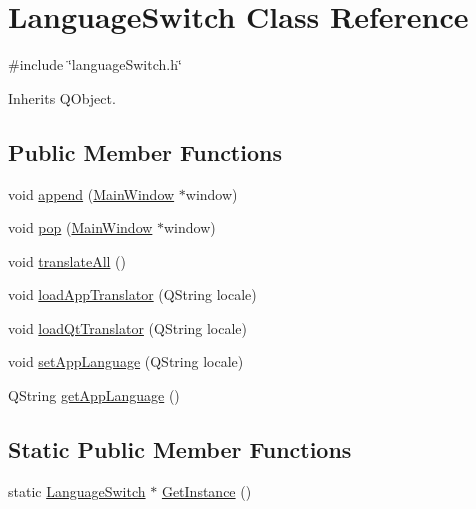 \hypertarget{class_language_switch}{}\section{Language\+Switch Class Reference}
\label{class_language_switch}


{\ttfamily \#include \char`\"{}language\+Switch.\+h\char`\"{}}



Inherits Q\+Object.

\subsection*{Public Member Functions}
\begin{DoxyCompactItemize}
\item 
void \mbox{\hyperlink{class_language_switch_ab97b59217547f4ac359b80132a41002b}{append}} (\mbox{\hyperlink{class_main_window}{Main\+Window}} $\ast$window)
\item 
void \mbox{\hyperlink{class_language_switch_ad3507c437b4a165484a385f6afe3882d}{pop}} (\mbox{\hyperlink{class_main_window}{Main\+Window}} $\ast$window)
\item 
void \mbox{\hyperlink{class_language_switch_a771b7ad7302497cff07d2c22c32974a1}{translate\+All}} ()
\item 
void \mbox{\hyperlink{class_language_switch_abbeea6d84e165377ab4d2707d013ad8f}{load\+App\+Translator}} (Q\+String locale)
\item 
void \mbox{\hyperlink{class_language_switch_a94b3b12b84af0f4eee8b2b90cbd1cebc}{load\+Qt\+Translator}} (Q\+String locale)
\item 
void \mbox{\hyperlink{class_language_switch_a3ee3f692430ab7bb6337dddc9dfc35cd}{set\+App\+Language}} (Q\+String locale)
\item 
Q\+String \mbox{\hyperlink{class_language_switch_a64444b644fb7f7a0612998d40928a8fc}{get\+App\+Language}} ()
\end{DoxyCompactItemize}
\subsection*{Static Public Member Functions}
\begin{DoxyCompactItemize}
\item 
static \mbox{\hyperlink{class_language_switch}{Language\+Switch}} $\ast$ \mbox{\hyperlink{class_language_switch_a3fb95c9db6175a4911766462bb141ec9}{Get\+Instance}} ()
\end{DoxyCompactItemize}

